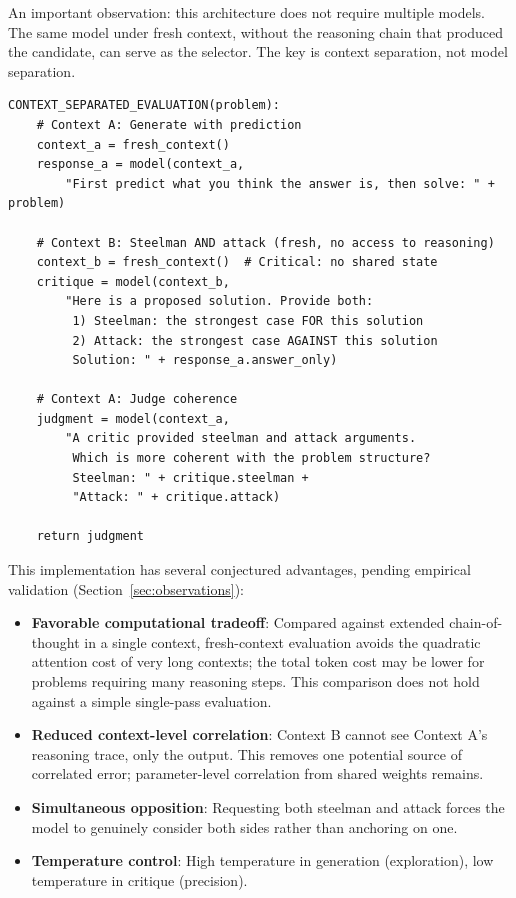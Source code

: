 \documentclass[11pt]{article}
\begin{document}
An important observation: this architecture does not require multiple models. The same model
under fresh context, without the reasoning chain that produced the candidate, can serve as
the selector. The key is context separation, not model separation.

\begin{verbatim}
CONTEXT_SEPARATED_EVALUATION(problem):
    # Context A: Generate with prediction
    context_a = fresh_context()
    response_a = model(context_a,
        "First predict what you think the answer is, then solve: " + problem)

    # Context B: Steelman AND attack (fresh, no access to reasoning)
    context_b = fresh_context()  # Critical: no shared state
    critique = model(context_b,
        "Here is a proposed solution. Provide both:
         1) Steelman: the strongest case FOR this solution
         2) Attack: the strongest case AGAINST this solution
         Solution: " + response_a.answer_only)

    # Context A: Judge coherence
    judgment = model(context_a,
        "A critic provided steelman and attack arguments.
         Which is more coherent with the problem structure?
         Steelman: " + critique.steelman +
         "Attack: " + critique.attack)

    return judgment
\end{verbatim}

This implementation has several conjectured advantages, pending empirical validation
(Section~\ref{sec:observations}):
\begin{itemize}
    \item \textbf{Favorable computational tradeoff}: Compared against extended
    chain-of-thought in a single context, fresh-context evaluation avoids the quadratic
    attention cost of very long contexts; the total token cost may be lower for problems
    requiring many reasoning steps. This comparison does not hold against a simple
    single-pass evaluation.
    \item \textbf{Reduced context-level correlation}: Context B cannot see Context A's
    reasoning trace, only the output. This removes one potential source of correlated error;
    parameter-level correlation from shared weights remains.
    \item \textbf{Simultaneous opposition}: Requesting both steelman and attack forces the
    model to genuinely consider both sides rather than anchoring on one.
    \item \textbf{Temperature control}: High temperature in generation (exploration), low
    temperature in critique (precision).
\end{itemize}
\end{document}
